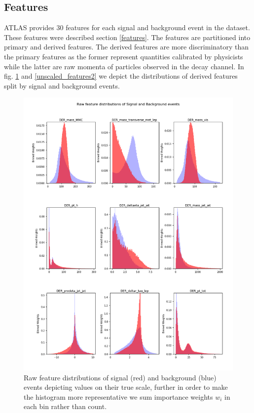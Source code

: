 \subsection{Features}

ATLAS provides 30 features for each signal and background event in the dataset. These features were described section \ref{features}. The features are partitioned into primary and derived features. The derived features are more discriminatory than the primary features as the former represent quantities calibrated by physicists while the latter are raw momenta of particles observed in the decay channel. In fig. \ref{unscaled_features1} and \ref{unscaled_features2} we depict the distributions of derived features split by signal and background events.

\begin{figure}
\includegraphics[width=\textwidth]{images/der_features1.png}
\caption[Raw feature distributions]{Raw feature distributions of signal (red) and background (blue) events depicting values on their true scale, further in order to make the histogram more representative we sum importance weights $w_{i}$ in each bin rather than count.}
\label{unscaled_features1}
\end{figure}

